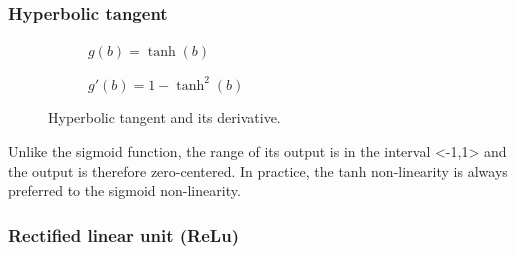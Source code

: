 \subsubsection{Hyperbolic tangent}

\vspace{5mm}
\begin{figure}[h]  
	\centering 
	\begin{subfigure}[b]{0.4\linewidth}
		\caption{$ g(b)=\tanh(b) $}   
	\end{subfigure}
	\begin{subfigure}[b]{0.4\linewidth}
		\caption{$ g'(b)=1-\tanh^2(b) $}  
	\end{subfigure}
	\vspace{10mm}
	\caption{Hyperbolic tangent and its derivative.}
\end{figure}

Unlike the sigmoid function, the range of its output is in the interval <-1,1> and the output is therefore zero-centered. In practice, the tanh non-linearity is always preferred to the sigmoid non-linearity. \cite{stanford-github}

\subsubsection{Rectified linear unit (ReLu)}
\vspace{5mm}

